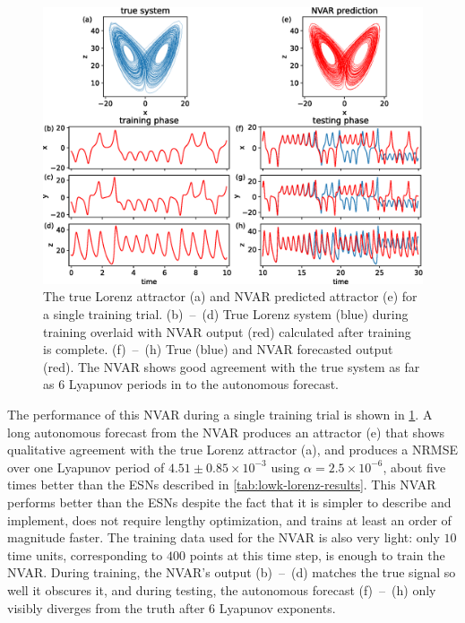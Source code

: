 \begin{figure}
  \includegraphics[width=\textwidth]{figures/nvar-predict-lorenz}
  \caption{The true Lorenz attractor (a) and NVAR predicted attractor
    (e) for a single training trial. (b)~--~(d) True Lorenz system
    (blue) during training overlaid with NVAR output (red) calculated
    after training is complete. (f)~--~(h) True (blue) and NVAR
    forecasted output (red). The NVAR shows good agreement with the
    true system as far as $6$ Lyapunov periods in to the autonomous
    forecast.}
  \label{fig:nvar-predict-lorenz}
\end{figure}

The performance of this NVAR during a single training trial is shown
in \cref{fig:nvar-predict-lorenz}. A long autonomous forecast from the
NVAR produces an attractor (e) that shows qualitative agreement with
the true Lorenz attractor (a), and produces a NRMSE over one Lyapunov
period of $4.51\pm0.85\times10^{-3}$ using $\alpha =
2.5\times10^{-6}$, about five times better than the ESNs described in
\cref{tab:lowk-lorenz-results}. This NVAR performs better than the
ESNs despite the fact that it is simpler to describe and implement,
does not require lengthy optimization, and trains at least an order of
magnitude faster. The training data used for the NVAR is also very
light: only $10$ time units, corresponding to $400$ points at this
time step, is enough to train the NVAR. During training, the NVAR's
output (b)~--~(d) matches the true signal so well it obscures it, and
during testing, the autonomous forecast (f)~--~(h) only visibly
diverges from the truth after $6$ Lyapunov exponents.

